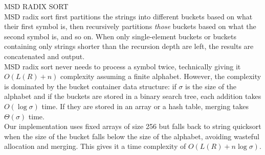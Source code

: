 {\sffamily\small{\color{sciorange} MSD RADIX SORT}}\vspace{1mm}\\
\footnotesize 
MSD radix sort first partitions the strings into different buckets based on
what their first symbol is, then recursively partitions \emph{those} buckets
based on what the second symbol is, and so on.  When only single-element
buckets or buckets containing only strings shorter than the recursion depth
are left, the results are concatenated and output.\\

MSD radix sort never needs to process a symbol twice, technically giving it
$O(L(R) + n)$ complexity assuming a finite alphabet.  However, the complexity
is dominated by the bucket container data structure: if $\sigma$ is the size of the
alphabet and if the buckets are stored in a binary search tree, each addition
takes $O(\log \sigma)$ time.  If they are stored in an array or a hash table, merging
takes $\Theta(\sigma)$ time.\\

Our implementation uses fixed arrays of size 256 but falls back to string
quicksort when the size of the bucket falls below the size of the alphabet,
avoiding wasteful allocation and merging.  This gives it a time complexity
of $O(L(R) + n \log \sigma)$.
